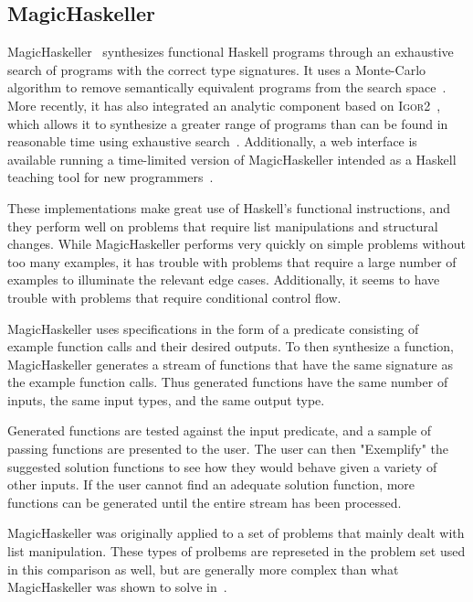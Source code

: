 \subsection{MagicHaskeller}

MagicHaskeller~\cite{katayama2010,Katayama05} synthesizes functional Haskell programs through an exhaustive search of programs with the correct type signatures. It uses a Monte-Carlo algorithm to remove semantically equivalent programs from the search space~\cite{Katayama2008}. More recently, it has also integrated an analytic component based on \textsc{Igor2}~\cite{kitzelmann2011two}, which allows it to synthesize a greater range of programs than can be found in reasonable time using exhaustive search~\cite{katayama2011magichaskeller}. Additionally, a web interface is available running a time-limited version of MagicHaskeller intended as a Haskell teaching tool for new programmers~\cite{katayama2013}. 

These implementations make great use of Haskell's functional instructions, and they perform well on problems that require list manipulations and structural changes. While MagicHaskeller performs very quickly on simple problems without too many examples, it has trouble with problems that require a large number of examples to illuminate the relevant edge cases. Additionally, it seems to have trouble with problems that require conditional control flow.

MagicHaskeller uses specifications in the form of a predicate consisting of example function calls and their desired outputs. To then synthesize a function, MagicHaskeller generates a stream of functions that have the same signature as the example function calls. Thus generated functions have the same number of inputs, the same input types, and the same output type.

Generated functions are tested against the input predicate, and a sample of passing functions are presented to the user. The user can then "Exemplify" the suggested solution functions to see how they would behave given a variety of other inputs. If the user cannot find an adequate solution function, more functions can be generated until the entire stream has been processed.

MagicHaskeller was originally applied to a set of problems that mainly dealt with list manipulation. These types of prolbems are represeted in the problem set used in this comparison as well, but are generally more complex than what MagicHaskeller was shown to solve in~\cite{katayama2013}.

